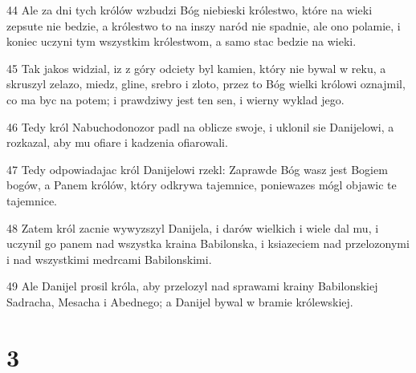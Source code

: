 \par 44 Ale za dni tych królów wzbudzi Bóg niebieski królestwo, które na wieki zepsute nie bedzie, a królestwo to na inszy naród nie spadnie, ale ono polamie, i koniec uczyni tym wszystkim królestwom, a samo stac bedzie na wieki.
\par 45 Tak jakos widzial, iz z góry odciety byl kamien, który nie bywal w reku, a skruszyl zelazo, miedz, gline, srebro i zloto, przez to Bóg wielki królowi oznajmil, co ma byc na potem; i prawdziwy jest ten sen, i wierny wyklad jego.
\par 46 Tedy król Nabuchodonozor padl na oblicze swoje, i uklonil sie Danijelowi, a rozkazal, aby mu ofiare i kadzenia ofiarowali.
\par 47 Tedy odpowiadajac król Danijelowi rzekl: Zaprawde Bóg wasz jest Bogiem bogów, a Panem królów, który odkrywa tajemnice, poniewazes mógl objawic te tajemnice.
\par 48 Zatem król zacnie wywyzszyl Danijela, i darów wielkich i wiele dal mu, i uczynil go panem nad wszystka kraina Babilonska, i ksiazeciem nad przelozonymi i nad wszystkimi medrcami Babilonskimi.
\par 49 Ale Danijel prosil króla, aby przelozyl nad sprawami krainy Babilonskiej Sadracha, Mesacha i Abednego; a Danijel bywal w bramie królewskiej.

\chapter{3}

